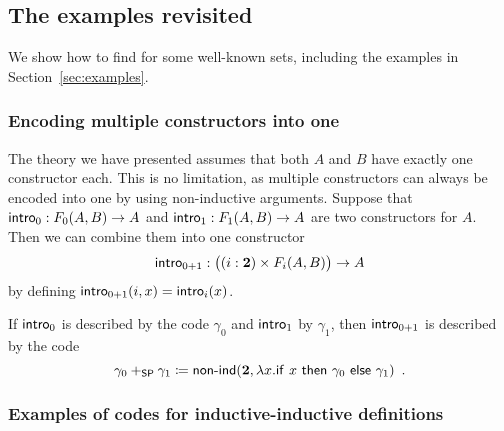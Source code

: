 \documentclass{article}
\begin{document}
\begin{example}



\end{example}

\subsection{The examples revisited}
\label{sec:examples-revisited}

We show how to find \gammaAB{} for some well-known sets, including the
examples in Section~\ref{sec:examples}.

\subsubsection{Encoding multiple constructors into one}
\label{sec:comb-constructors}

The theory we have presented assumes that both $A$ and $B$ have
exactly one constructor each. This is no limitation, as multiple
constructors can always be encoded into one by using non-inductive
arguments. Suppose that $\mathsf{intro}_{0} : F_0(A, B) \to A$ and $\mathsf{intro}_{1} :
F_1(A, B) \to A$ are two constructors for $A$. Then we can combine
them into one constructor
\[
\mathsf{intro}_{0 + 1} : \big((i : \mathbf{2}) \times F_i(A, B)\big) \to A
\]
by defining $\mathsf{intro}_{0 +1}(i, x) = \mathsf{intro}_{i}(x)$.

If $\mathsf{intro}_{0}$ is described by the code $\gamma_0$ and $\mathsf{intro}_{1}$ by
$\gamma_1$, then $\mathsf{intro}_{0 + 1}$ is described by the code
\[
\gamma_0 +_{\mathsf{SP}} \gamma_1 \coloneqq
\mathsf{non}\text{-}\mathsf{ind}(\mathbf{2}, \lambda x.\mathsf{if}~x~\mathsf{then}~\gamma_0~\mathsf{else}~\gamma_1) \enspace .
\]


\subsubsection{Examples of codes for inductive-inductive definitions}
\end{document}
